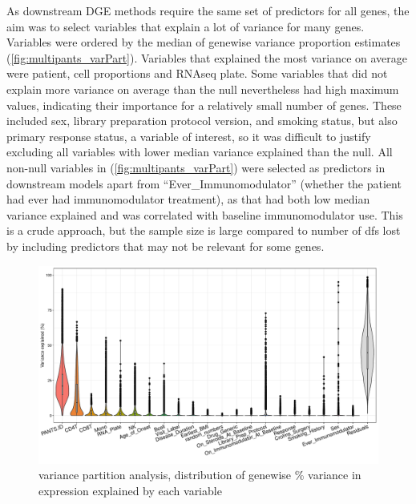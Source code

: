 \begin{outline}
As downstream \gls{DGE} methods require the same set of predictors for all genes, the aim was to select variables that explain a lot of variance for many genes.
Variables were ordered by the median of genewise variance proportion estimates (\autoref{fig:multipants_varPart}).
Variables that explained the most variance on average were patient, cell proportions and \gls{RNAseq} plate.
Some variables that did not explain more variance on average than the null nevertheless had high maximum values, indicating their importance for a relatively small number of genes.
These included sex, library preparation protocol version, and smoking status, but also primary response status, a variable of interest,
so it was difficult to justify excluding all variables with lower median variance explained than the null.
All non-null variables in (\autoref{fig:multipants_varPart}) were selected as predictors in downstream models apart from \enquote{Ever\_Immunomodulator} 
(whether the patient had ever had immunomodulator treatment), 
as that had both low median variance explained and was correlated with baseline immunomodulator use.
This is a crude approach, but the sample size is large compared to number of \glspl{df} lost by including predictors that may not be relevant for some genes.

\begin{figure}
    \centering
    \includegraphics[width=1.0\textwidth,page=1]{mainmatter/figures/chapter_04/dream.plotVarPart.pdf}
    \caption{variance partition analysis, distribution of genewise \% variance in expression explained by each variable}
    \label{fig:multipants_varPart}
\end{figure}


\end{outline}

